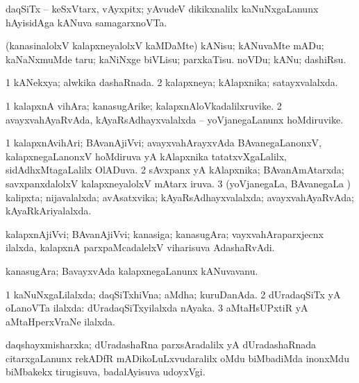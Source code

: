 \noindent 
\gl{\pagu}
\expl{}
\bmng
  daqSiTx -- keSxVtarx, vAyxpitx; yAvudeV dikikxnalilx kaNuNxgaLanunx hAyisidAga kANuva samagarxnoVTa. 
\emng
\eentry

\bentry 
{} 
\gl{\sakirx}
\expl{}
\bmng
 (kanasinalolxV kalapxneyalolxV kaMDaMte) 
\banum
{} kANisu; kANuvaMte mADu; kaNaNxmuMde taru; kaNiNxge biVLisu; parxkaTisu. 
 noVDu; kANu; dashiRsu. 
\eanum
\emng
\eentry

\bentry
{} 
\gl{\gu}
\expl{}
\bmng
\bnum
\num{1} kANekxya; alwkika dashaRnada. 
\num{2} kalapxneya; kAlapxnika; satayxvalalxda. 
\enum
\emng
\eentry

\bentry 
{} 
\gl{\nA}
\expl{}
\bmng
\bnum
\num{1} kalapxnA vihAra; kanasugArike; kalapxnAloVkadalilxruvike. 
\num{2} avayxvahAyaRvAda, kAyaRsAdhayxvalalxda -- yoVjanegaLanunx hoMdiruvike. 
\enum
\emng
\eentry

\bentry 
{} 
\gl{\gu}
\expl{}
\bmng
\bnum
\num{1} kalapxnAvihAri; BAvanAjiVvi; avayxvahArayxvAda BAvanegaLanonxV, kalapxnegaLanonxV hoMdiruva yA kAlapxnika tatatxvXgaLalilx, sidAdhxMtagaLalilx OlADuva. 
\num{2} sAvxpanx yA kAlapxnika; BAvanAmAtarxda; savxpanxdalolxV kalapxneyalolxV mAtarx iruva. 
\num{3} (yoVjanegaLa, BAvanegaLa \vi) kalipxta; nijavalalxda; avAsatxvika; kAyaRsAdhayxvalalxda; avayxvahAyaRvAda; kAyaRkAriyalalxda. 
\enum
\emng
\eentry

\bentry 
{} 
\gl{\nA}
\bmng
 kalapxnAjiVvi; BAvanAjiVvi; kanasiga; kanasugAra; vayxvahAraparxjecnx ilalxda, kalapxnA parxpaMcadalelxV viharisuva AdashaRvAdi. 
\emng
\eentry

\bentry 
{} 
\gl{\nA}
\expl{}
\bmng
 kanasugAra; BavayxvAda kalapxnegaLanunx kANuvavanu. 
\emng
\eentry

\bentry 
{} 
\gl{\gu}
\expl{}
\bmng
\bnum
\num{1} kaNuNxgaLilalxda; daqSiTxhiVna; aMdha; kuruDanAda. 
\num{2} dUradaqSiTx yA oLanoVTa ilalxda:  dUradaqSiTxyilalxda nAyaka. 
\num{3} aMtaHsUPxtiR yA aMtaHperxVraNe ilalxda. 
\enum
\emng
\eentry

\bentry
{} 
\gl{\nA}
\expl{}
\bmng
 daqshayxmisharxka; dUradashaRna parxsAradalilx yA dUradashaRnada citarxgaLanunx rekADfR mADikoLuLxvudaralilx oMdu biMbadiMda inonxMdu biMbakekx tirugisuva, badalAyisuva udoyxVgi. 
\emng
\eentry

